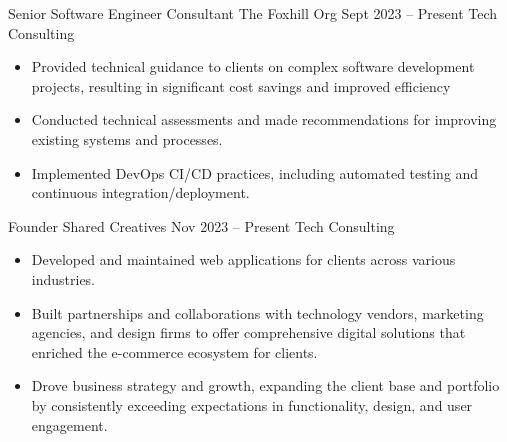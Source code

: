 
\cvexperience
{Senior Software Engineer Consultant}
{The Foxhill Org}
{Sept 2023 – Present}
{Tech Consulting}
{\footnotesize\faCode \hspace{1pt}     }
\begin{itemize}
    \item Provided technical guidance to clients on complex software development projects, resulting in significant cost savings and improved efficiency
    \item Conducted technical assessments and made recommendations for improving existing systems and processes.
    \item Implemented DevOps CI/CD practices, including automated testing and continuous integration/deployment.

\end{itemize}

\medskip

\cvexperience
{Founder}
{Shared Creatives}
{Nov 2023 – Present}
{Tech Consulting}
{\footnotesize\faCode \hspace{1pt}   }
\begin{itemize}
    \item Developed and maintained web applications for clients across various industries.
    \item Built partnerships and collaborations with technology vendors, marketing agencies, and design firms to offer comprehensive digital solutions that enriched the e-commerce ecosystem for clients.
    \item Drove business strategy and growth, expanding the client base and portfolio by consistently exceeding expectations in functionality, design, and user engagement.
\end{itemize}

\medskip


